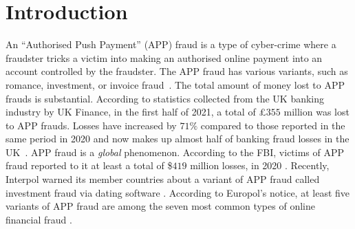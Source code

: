 
\section{Introduction}\label{sec::intro}

An  ``Authorised Push Payment'' (APP) fraud is a type of cyber-crime where a fraudster tricks a victim into making an authorised online payment into an account controlled by the fraudster.  The APP fraud has various variants, such as romance, investment, or invoice fraud~\cite{overview-of-payment-fraud}. The total amount of money lost to  APP frauds is substantial. According to
statistics collected from the UK banking industry by UK Finance,  in the first half of 2021, a total of £$355$ million was lost to APP frauds. Losses have increased by  $71\%$  compared to those reported in the same period in 2020 and now makes up almost half of banking fraud losses in the UK~\cite{2021-Half-Year-Fraud-Update}. 
APP fraud is a \emph{global} phenomenon. According to the FBI, victims of APP fraud reported to it at least a total of  \$$419$ million losses, in 2020 \cite{internet-crime-report}. Recently, Interpol warned its member countries about a    variant of APP fraud called investment fraud via dating software \cite{interpol-notce}. According to  Europol’s notice, at least five variants of APP fraud are among the seven most common types of online financial fraud \cite{europol-notice}. 



